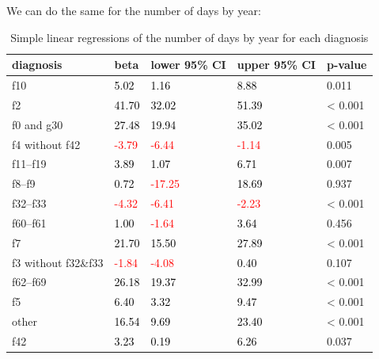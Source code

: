 \documentclass[
]{book}
\theoremstyle{definition}
\theoremstyle{definition}
\theoremstyle{definition}
\theoremstyle{definition}
\theoremstyle{remark}
\begin{document}
We can do the same for the number of days by year:

\begin{table}
\centering
\caption{\label{tab:days-by-year}Simple linear regressions of the number of days by year for each diagnosis}
\centering
\begin{tabular}[t]{l|>{}l|>{}l|>{}l|l}
\hline
diagnosis & beta & lower 95\% CI & upper 95\% CI & p-value\\
\hline
f10 & \textcolor{black}{5.02} & \textcolor{black}{1.16} & \textcolor{black}{8.88} & 0.011\\
\hline
f2 & \textcolor{black}{41.70} & \textcolor{black}{32.02} & \textcolor{black}{51.39} & < 0.001\\
\hline
f0 and g30 & \textcolor{black}{27.48} & \textcolor{black}{19.94} & \textcolor{black}{35.02} & < 0.001\\
\hline
f4 without f42 & \textcolor{red}{-3.79} & \textcolor{red}{-6.44} & \textcolor{red}{-1.14} & 0.005\\
\hline
f11–f19 & \textcolor{black}{3.89} & \textcolor{black}{1.07} & \textcolor{black}{6.71} & 0.007\\
\hline
f8–f9 & \textcolor{black}{0.72} & \textcolor{red}{-17.25} & \textcolor{black}{18.69} & 0.937\\
\hline
f32–f33 & \textcolor{red}{-4.32} & \textcolor{red}{-6.41} & \textcolor{red}{-2.23} & < 0.001\\
\hline
f60–f61 & \textcolor{black}{1.00} & \textcolor{red}{-1.64} & \textcolor{black}{3.64} & 0.456\\
\hline
f7 & \textcolor{black}{21.70} & \textcolor{black}{15.50} & \textcolor{black}{27.89} & < 0.001\\
\hline
f3 without f32\&f33 & \textcolor{red}{-1.84} & \textcolor{red}{-4.08} & \textcolor{black}{0.40} & 0.107\\
\hline
f62–f69 & \textcolor{black}{26.18} & \textcolor{black}{19.37} & \textcolor{black}{32.99} & < 0.001\\
\hline
f5 & \textcolor{black}{6.40} & \textcolor{black}{3.32} & \textcolor{black}{9.47} & < 0.001\\
\hline
other & \textcolor{black}{16.54} & \textcolor{black}{9.69} & \textcolor{black}{23.40} & < 0.001\\
\hline
f42 & \textcolor{black}{3.23} & \textcolor{black}{0.19} & \textcolor{black}{6.26} & 0.037\\
\hline
\end{tabular}
\end{table}
\end{document}
